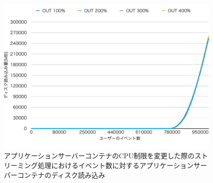 \documentclass[../../../../../main]{subfiles}
\begin{document}
    \begin{figure}[H]
        \centering
        \includegraphics[width=12cm]{graph}
        \caption{アプリケーションサーバーコンテナのCPU制限を変更した際のストリーミング処理におけるイベント数に対するアプリケーションサーバーコンテナのディスク読み込み}
        \label{fig:stream-change-app-cpu-limit-app-disk-out-app_1024-db_1_1024}
    \end{figure}
\end{document}
